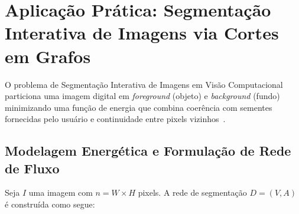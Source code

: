 \chapter{Aplicação Prática: Segmentação Interativa de Imagens via Cortes em Grafos}\label{sec:segmentacao}

O problema de Segmentação Interativa de Imagens em Visão Computacional particiona uma imagem digital em \textit{foreground} (objeto) e \textit{background} (fundo) minimizando uma função de energia que combina coerência com sementes fornecidas pelo usuário e continuidade entre pixels vizinhos~\cite{cook1998combinatorial}.


\section{Modelagem Energética e Formulação de Rede de Fluxo}

Seja $I$ uma imagem com $n = W \times H$ pixels. A rede de segmentação $D = (V, A)$ é construída como segue:

